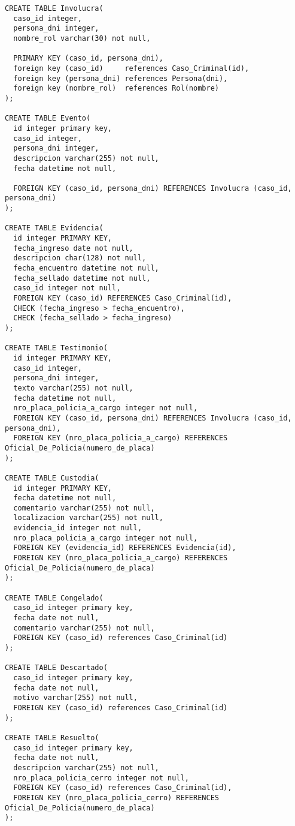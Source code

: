 \documentclass[10pt,a4paper]{article}
\begin{document}
\begin{verbatim}
CREATE TABLE Involucra(
  caso_id integer,
  persona_dni integer,
  nombre_rol varchar(30) not null,

  PRIMARY KEY (caso_id, persona_dni),
  foreign key (caso_id)     references Caso_Criminal(id),
  foreign key (persona_dni) references Persona(dni),
  foreign key (nombre_rol)  references Rol(nombre)
);

CREATE TABLE Evento(
  id integer primary key,
  caso_id integer,
  persona_dni integer,
  descripcion varchar(255) not null,
  fecha datetime not null,

  FOREIGN KEY (caso_id, persona_dni) REFERENCES Involucra (caso_id, persona_dni)
);

CREATE TABLE Evidencia(
  id integer PRIMARY KEY,
  fecha_ingreso date not null,
  descripcion char(128) not null,
  fecha_encuentro datetime not null,
  fecha_sellado datetime not null,
  caso_id integer not null,
  FOREIGN KEY (caso_id) REFERENCES Caso_Criminal(id),
  CHECK (fecha_ingreso > fecha_encuentro),
  CHECK (fecha_sellado > fecha_ingreso)
);

CREATE TABLE Testimonio(
  id integer PRIMARY KEY,
  caso_id integer,
  persona_dni integer,
  texto varchar(255) not null,
  fecha datetime not null,
  nro_placa_policia_a_cargo integer not null,
  FOREIGN KEY (caso_id, persona_dni) REFERENCES Involucra (caso_id, persona_dni),
  FOREIGN KEY (nro_placa_policia_a_cargo) REFERENCES Oficial_De_Policia(numero_de_placa)
);

CREATE TABLE Custodia(
  id integer PRIMARY KEY,
  fecha datetime not null,
  comentario varchar(255) not null,
  localizacion varchar(255) not null,
  evidencia_id integer not null,
  nro_placa_policia_a_cargo integer not null,
  FOREIGN KEY (evidencia_id) REFERENCES Evidencia(id),
  FOREIGN KEY (nro_placa_policia_a_cargo) REFERENCES Oficial_De_Policia(numero_de_placa)
);

CREATE TABLE Congelado(
  caso_id integer primary key,
  fecha date not null,
  comentario varchar(255) not null,
  FOREIGN KEY (caso_id) references Caso_Criminal(id)
);

CREATE TABLE Descartado(
  caso_id integer primary key,
  fecha date not null,
  motivo varchar(255) not null,
  FOREIGN KEY (caso_id) references Caso_Criminal(id)
);

CREATE TABLE Resuelto(
  caso_id integer primary key,
  fecha date not null,
  descripcion varchar(255) not null,
  nro_placa_policia_cerro integer not null,
  FOREIGN KEY (caso_id) references Caso_Criminal(id),
  FOREIGN KEY (nro_placa_policia_cerro) REFERENCES Oficial_De_Policia(numero_de_placa)
);


\end{verbatim}
\end{document}

